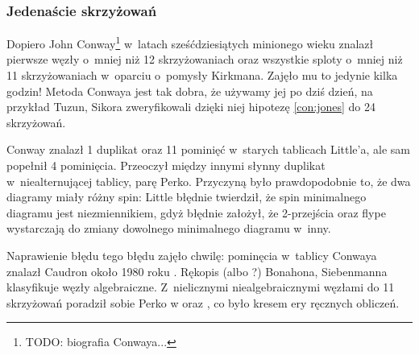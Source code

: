 
\subsubsection{Jedenaście skrzyżowań}
Dopiero John Conway\footnote{TODO: biografia Conwaya...} w~latach sześćdziesiątych minionego wieku znalazł pierwsze węzły o~mniej niż 12 skrzyżowaniach oraz wszystkie sploty o~mniej niż 11 skrzyżowaniach w~oparciu o~pomysły Kirkmana.
%
Zajęło mu to jedynie kilka godzin!
Metoda Conwaya jest tak dobra, że używamy jej po dziś dzień, na przykład Tuzun, Sikora zweryfikowali dzięki niej hipotezę \ref{con:jones} do 24 skrzyżowań.
%
%

Conway znalazł 1 duplikat oraz 11 pominięć w~starych tablicach Little'a, ale sam popełnił 4 pominięcia.
Przeoczył między innymi słynny duplikat w~niealternującej tablicy, parę Perko.
%
%
Przyczyną było prawdopodobnie to, że dwa diagramy miały różny spin:
Little błędnie twierdził, że spin minimalnego diagramu jest niezmiennikiem, gdyż błędnie założył, że 2-przejścia oraz flype wystarczają do zmiany dowolnego minimalnego diagramu w~inny.
%

Naprawienie błędu tego błędu zajęło chwilę: pominęcia w~tablicy Conwaya znalazł Caudron około 1980 roku \cite{caudron82}.
%
Rękopis \cite{bonahon80} (albo \cite{bonahon89}?) Bonahona, Siebenmanna klasyfikuje węzły algebraiczne.
%
%
Z~nielicznymi niealgebraicznymi węzłami do 11 skrzyżowań poradził sobie Perko w \cite{perko80} oraz \cite{perko82}, co było kresem ery ręcznych obliczeń.
%


